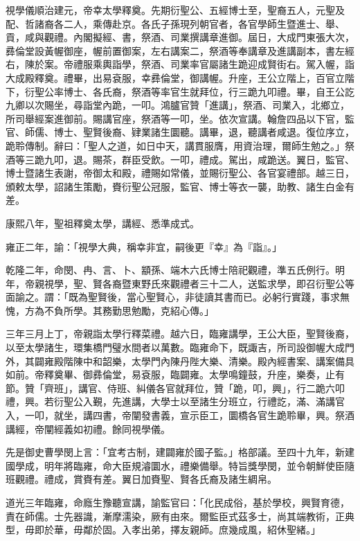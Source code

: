 \begin{pinyinscope}
視學儀順治建元，帝幸太學釋奠。先期衍聖公、五經博士至，聖裔五人，元聖及配、哲諸裔各二人，乘傳赴京。各氏子孫現列朝官者，各官學師生暨進士、舉、貢，咸與觀禮。內閣擬經、書，祭酒、司業撰講章進御。屆日，大成門東張大次，彞倫堂設黃幄御座，幄前置御案，左右講案二，祭酒等奉講章及進講副本，書左經右，陳於案。帝禮服乘輿詣學，祭酒、司業率官屬諸生跪迎成賢街右。駕入幄，詣大成殿釋奠。禮畢，出易袞服，幸彞倫堂，御講幄。升座，王公立階上，百官立階下，衍聖公率博士、各氏裔，祭酒等率官生就拜位，行三跪九叩禮。畢，自王公訖九卿以次賜坐，尋詣堂內跪，一叩。鴻臚官贊「進講」，祭酒、司業入，北鄉立，所司舉經案進御前。賜講官座，祭酒等一叩，坐。依次宣講。翰詹四品以下官，監官、師儒、博士、聖賢後裔、肄業諸生圜聽。講畢，退，聽講者咸退。復位序立，跪聆傳制。辭曰：「聖人之道，如日中天，講貫服膺，用資治理，爾師生勉之。」祭酒等三跪九叩，退。賜茶，群臣受飲。一叩，禮成。駕出，咸跪送。翼日，監官、博士暨諸生表謝，帝御太和殿，禮賜如常儀，並賜衍聖公、各官宴禮部。越三日，頒敕太學，詔諸生策勵，賚衍聖公冠服，監官、博士等衣一襲，助教、諸生白金有差。

康熙八年，聖祖釋奠太學，講經、悉準成式。

雍正二年，諭：「視學大典，稱幸非宜，嗣後更『幸』為『詣』。」

乾隆二年，命閔、冉、言、卜、顓孫、端木六氏博士陪祀觀禮，準五氏例行。明年，帝親視學，聖、賢各裔暨東野氏來觀禮者三十二人，送監求學，即召衍聖公等面諭之。謂：「既為聖賢後，當心聖賢心，非徒讀其書而已。必躬行實踐，事求無愧，方為不負所學。其務勤思勉勵，克紹心傳。」

三年三月上丁，帝親詣太學行釋菜禮。越六日，臨雍講學，王公大臣，聖賢後裔，以至太學諸生，環集橋門璧水間者以萬數。臨雍命下，既諏吉，所司設御幄大成門外，其闢雍殿階陳中和韶樂，太學門內陳丹陛大樂、清樂。殿內經書案、講案備具如前。帝釋奠畢、御彞倫堂，易袞服，臨闢雍。太學鳴鐘鼓，升座，樂奏，止有節。贊「齊班」，講官、侍班、糾儀各官就拜位，贊「跪，叩，興」，行二跪六叩禮，興。若衍聖公入覲，先進講，大學士以至諸生分班立，行禮訖，滿、滿講官入，一叩，就坐，講四書，帝闡發書義，宣示臣工，圜橋各官生跪聆畢，興。祭酒講經，帝闡經義如初禮。餘同視學儀。

先是御史曹學閔上言：「宜考古制，建闢雍於國子監。」格部議。至四十九年，新建國學成，明年將臨雍，命大臣規濬圜水，禮樂備舉。特旨獎學閔，並令朝鮮使臣隨班觀禮。禮成，賞賚有差。翼日加賚聖、賢各氏裔及諸生綢帛。

道光三年臨雍，命廕生豫聽宣講，諭監官曰：「化民成俗，基於學校，興賢育德，責在師儒。士先器識，漸摩濡染，厥有由來。爾監臣式茲多士，尚其端教術，正典型，毋即於華，毋鄰於固。入孝出弟，擇友親師。庶幾成風，紹休聖緒。」


\end{pinyinscope}
